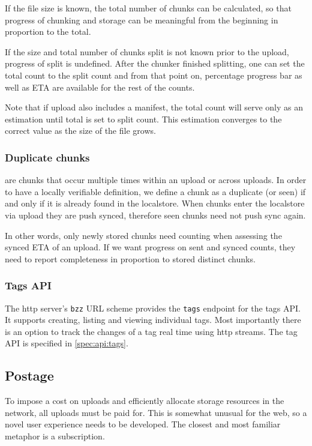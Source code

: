 If the file size is known, the total number of chunks can be calculated, so that progress of chunking and storage can be meaningful from the beginning in proportion to the total.

If the size and total number of chunks split is not known prior to the upload, progress of split is undefined. After the chunker finished splitting, one can set the total count to the split count and from that point on, percentage progress bar as well as ETA are available for the rest of the counts.

Note that if upload also includes a manifest, the total count will serve only as an estimation until total is set to split count. This estimation converges to the correct value as the size of the file grows.


\subsubsection{Duplicate chunks}

 are chunks that occur multiple times within an upload or across uploads. In order to have a locally verifiable definition, we define a chunk as a duplicate (or seen) if and only if it is already found in the localstore.
When chunks enter the localstore via upload they are push synced, therefore seen chunks need not push sync again.

In other words, only newly stored chunks need counting when assessing the synced ETA of an upload. If we want progress on sent and synced counts, they need to report completeness in proportion to stored distinct chunks.

\subsubsection{Tags API} 

The http server's \lstinline{bzz} URL scheme provides the \lstinline{tags} endpoint for the tags API. It supports creating, listing and viewing individual tags. Most importantly there is an option to track the changes of a tag real time using http streams. The tag API is specified in \ref{spec:api:tags}.



\subsection{Postage \statusgreen}\label{sec:postage-ux}

To impose a cost on uploads and efficiently allocate storage resources in the network, all uploads must be paid for.  This is somewhat unusual for the web, so a novel user experience needs to be developed. The closest and most familiar metaphor is a subscription.

